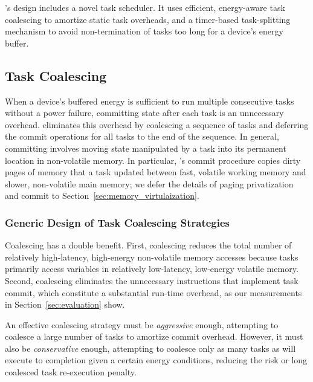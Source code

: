 \sys's design includes a novel task scheduler. It uses efficient, energy-aware task coalescing to amortize static task overheads, and a timer-based task-splitting mechanism to avoid non-termination of tasks too long for a device's energy buffer. 

\subsection{Task Coalescing}
\label{sec:task_coalescing}

When a device's buffered energy is sufficient to run multiple consecutive tasks without a power failure, committing state after each task is an unnecessary overhead. \sys eliminates this overhead by coalescing a sequence of tasks and deferring the commit
operations for all tasks to the end of the sequence. In general, committing involves moving state manipulated by a task into its permanent location in non-volatile memory. In particular, \sys's commit procedure copies dirty pages of memory that a task updated between fast, volatile working memory and slower, non-volatile main memory; we defer the details of paging privatization and commit to Section~\ref{sec:memory_virtulaization}.

\subsubsection{Generic Design of Task Coalescing Strategies}
\label{subsec:coalescingGeneral}

Coalescing has a double benefit. First, coalescing reduces the total number of relatively high-latency, high-energy non-volatile memory accesses because tasks primarily access variables in relatively low-latency, low-energy volatile memory. Second, coalescing eliminates the unnecessary instructions that implement task commit, which constitute a substantial run-time overhead, as our measurements in Section~\ref{sec:evaluation} show.

An effective coalescing strategy must be {\em aggressive} enough, attempting to coalesce a large number of tasks to amortize commit overhead. However, it must also be  {\em conservative} enough, attempting to coalesce only as many tasks as will execute to completion given a certain energy conditions, reducing the risk or long coalesced task re-execution penalty. 


